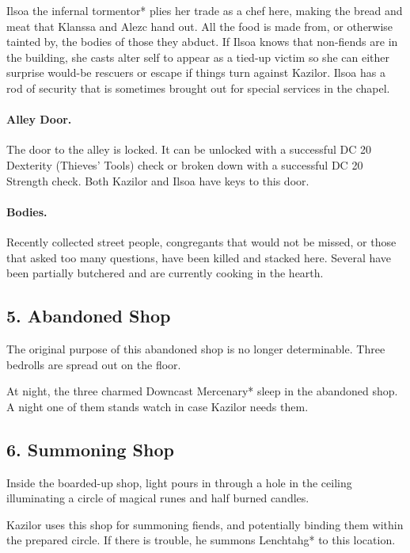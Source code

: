 \documentclass[10pt,a4paper,twoside,twocolumn,openany,bg=print,nodeprecatedcode]{dndbook}
\begin{document}
Ilsoa the infernal tormentor* plies her trade as a chef here, making the bread and meat that Klanssa and Alezc hand out. All the food is made from, or otherwise tainted by, the bodies of those they abduct. If Ilsoa knows that non-fiends are in the building, she casts alter self to appear as a tied-up victim so she can either surprise would-be rescuers or escape if things turn against Kazilor. Ilsoa has a rod of security that is sometimes brought out for special services in the chapel.
\paragraph{Alley Door.}
The door to the alley is locked. It can be unlocked with a successful DC 20 Dexterity (Thieves' Tools) check or broken down with a successful DC 20 Strength check. Both Kazilor and Ilsoa have keys to this door.
\paragraph{Bodies.}
Recently collected street people, congregants that would not be missed, or those that asked too many questions, have been killed and stacked here. Several have been partially butchered and are currently cooking in the hearth.
\subsection{5. Abandoned Shop}
\begin{DndReadAloud}{}
The original purpose of this abandoned shop is no longer determinable. Three bedrolls are spread out on the floor.
\end{DndReadAloud}

At night, the three charmed Downcast Mercenary* sleep in the abandoned shop. A night one of them stands watch in case Kazilor needs them.
\subsection{6. Summoning Shop}
\begin{DndReadAloud}{}
Inside the boarded-up shop, light pours in through a hole in the ceiling illuminating a circle of magical runes and half burned candles.
\end{DndReadAloud}

Kazilor uses this shop for summoning fiends, and potentially binding them within the prepared circle. If there is trouble, he summons Lenchtahg* to this location.
\end{document}
